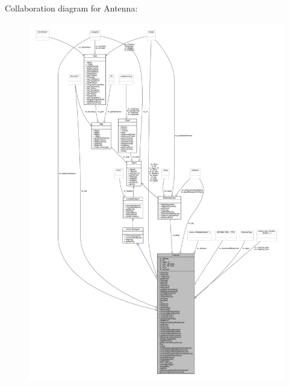 Collaboration diagram for Antenna\+:\nopagebreak
\begin{figure}[H]
\begin{center}
\leavevmode
\includegraphics[width=350pt]{class_antenna__coll__graph}
\end{center}
\end{figure}
